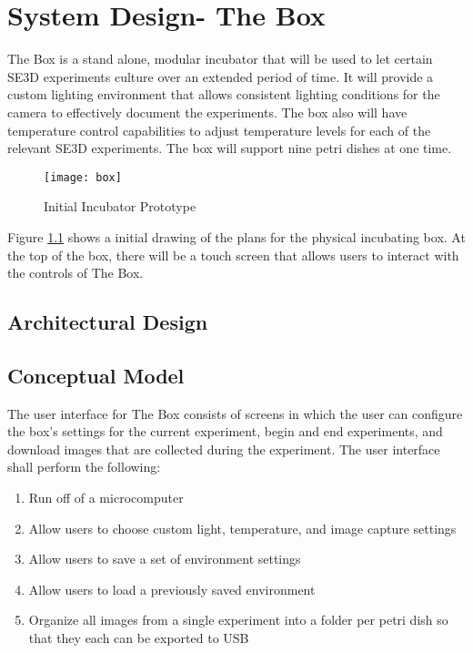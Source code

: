 \chapter{System Design- The Box}

The Box is a stand alone, modular incubator that will be used to let certain SE3D experiments culture over an extended period of time. It will provide a custom lighting environment that allows consistent lighting conditions for the camera to effectively document the experiments. The box also will have temperature control capabilities to adjust temperature levels for each of the relevant SE3D experiments. The box will support nine petri dishes at one time.

\begin{figure}[H]
\texttt{[image: box]}
\caption{\label{figure:box} Initial Incubator Prototype}
\end{figure}

Figure \ref{figure:box} shows a initial drawing of the plans for the physical incubating box. At the top of the box, there will be a touch screen that allows users to interact with the controls of The Box.



\section{Architectural Design}







\section{Conceptual Model}

The user interface for The Box consists of screens in which the user can configure the box’s settings for the current experiment, begin and end experiments, and download images that are collected during the experiment. The user interface shall perform the following: 

\begin{enumerate}
	\item	Run off of a microcomputer
	\item	Allow users to choose custom light, temperature, and image capture settings
	\item   Allow users to save a set of environment settings
	\item	Allow users to load a previously saved environment 
	\item	Organize all images from a single experiment into a folder per petri dish so that they each can be exported to USB 

\end{enumerate}

